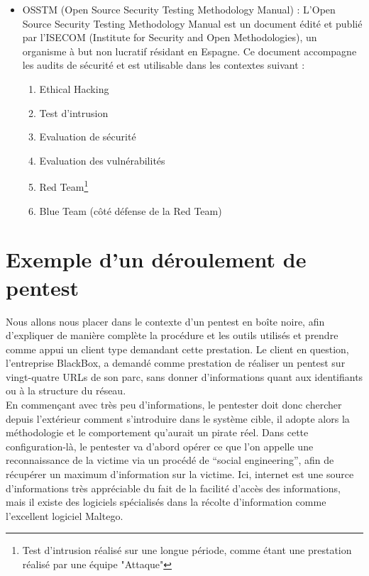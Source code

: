 \documentclass[a4paper]{memoir}
\begin{document}
\begin{itemize}
\item OSSTM (Open Source Security Testing Methodology Manual) : L’Open Source Security Testing Methodology Manual est un document édité et publié par l’ISECOM (Institute for Security and Open Methodologies), un organisme à but non lucratif résidant en Espagne. Ce document accompagne les audits de sécurité et est utilisable dans les contextes suivant : 
\begin{enumerate}
\item Ethical Hacking
\item Test d'intrusion
\item Evaluation de sécurité
\item Evaluation des vulnérabilités
\item Red Team\footnote{Test d'intrusion réalisé sur une longue période, comme étant une prestation réalisé par une équipe "Attaque"}
\item Blue Team (côté défense de la Red Team)\\
\end{enumerate}
\end{itemize}

\newpage

\section{Exemple d'un déroulement de pentest}

Nous allons nous placer dans le contexte d'un pentest en boîte noire, afin d'expliquer de manière complète la procédure et les outils utilisés et prendre comme appui un client type demandant cette prestation. Le client en question, l'entreprise BlackBox, a demandé comme prestation de réaliser un pentest sur vingt-quatre URLs de son parc, sans donner d'informations quant aux identifiants ou à la structure du réseau.\\

En commençant avec très peu d’informations, le pentester doit donc chercher depuis l'extérieur comment s’introduire dans le système cible, il adopte alors la méthodologie et le comportement qu’aurait un pirate réel. 
Dans cette configuration-là, le pentester va d'abord opérer ce que l'on appelle une reconnaissance de la victime via un procédé de ``social engineering'', afin de récupérer un maximum d'information sur la victime. Ici, internet est une source d'informations très appréciable du fait de la facilité d'accès des informations, mais il existe des logiciels spécialisés dans la récolte d'information comme l'excellent logiciel Maltego.\\
\end{document}
